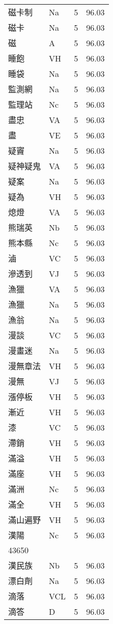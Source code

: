 \documentclass[twocolumn]{book}
\begin{document}
\begin{supertabular}{llrr}
磁卡制 & Na & 5 &  96.03\\
磁卡 & Na & 5 &  96.03\\
磁 & A & 5 &  96.03\\
睡飽 & VH & 5 &  96.03\\
睡袋 & Na & 5 &  96.03\\
監測網 & Na & 5 &  96.03\\
監理站 & Nc & 5 &  96.03\\
盡忠 & VA & 5 &  96.03\\
盡 & VE & 5 &  96.03\\
疑竇 & Na & 5 &  96.03\\
疑神疑鬼 & VA & 5 &  96.03\\
疑案 & Na & 5 &  96.03\\
疑為 & VH & 5 &  96.03\\
熄燈 & VA & 5 &  96.03\\
熊瑞英 & Nb & 5 &  96.03\\
熊本縣 & Nc & 5 &  96.03\\
滷 & VC & 5 &  96.03\\
滲透到 & VJ & 5 &  96.03\\
漁獵 & VA & 5 &  96.03\\
漁獵 & Na & 5 &  96.03\\
漁翁 & Na & 5 &  96.03\\
漫談 & VC & 5 &  96.03\\
漫畫迷 & Na & 5 &  96.03\\
漫無章法 & VH & 5 &  96.03\\
漫無 & VJ & 5 &  96.03\\
漲停板 & VH & 5 &  96.03\\
漸近 & VH & 5 &  96.03\\
漆 & VC & 5 &  96.03\\
滯銷 & VH & 5 &  96.03\\
滿溢 & VH & 5 &  96.03\\
滿座 & VH & 5 &  96.03\\
滿洲 & Nc & 5 &  96.03\\
滿全 & VH & 5 &  96.03\\
滿山遍野 & VH & 5 &  96.03\\
漢陽 & Nc & 5 &  96.03\\
43650\\
漢民族 & Nb & 5 &  96.03\\
漂白劑 & Na & 5 &  96.03\\
滴落 & VCL & 5 &  96.03\\
滴答 & D & 5 &  96.03\\

\end{supertabular}
\end{document}
